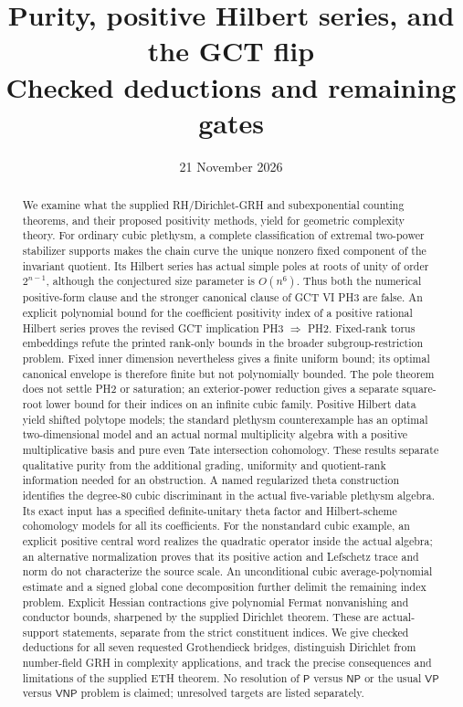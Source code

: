 \documentclass[11pt,a4paper]{article}
\title{Purity, positive Hilbert series, and the GCT flip\\[5pt]\large Checked deductions and remaining gates}
\author{}
\date{21 November 2026}
\begin{document}
\maketitle
\begin{abstract}
We examine what the supplied RH/Dirichlet-GRH and subexponential counting
theorems, and their proposed positivity methods, yield for geometric
complexity theory. For ordinary cubic plethysm, a complete classification
of extremal two-power stabilizer supports makes the chain curve the unique
nonzero fixed component of the invariant quotient. Its Hilbert series
has actual simple poles at roots of unity of order $2^{n-1}$,
although the conjectured size
parameter is $O(n^6)$. Thus both the numerical positive-form clause and
the stronger canonical clause of GCT VI PH3 are false. An explicit
polynomial bound for the coefficient
positivity index of a positive rational Hilbert series proves the revised
GCT implication PH3 $\Rightarrow$ PH2. Fixed-rank torus embeddings refute
the printed rank-only bounds in the broader subgroup-restriction problem.
Fixed inner dimension nevertheless gives a finite uniform bound; its
optimal canonical envelope is therefore finite but not polynomially
bounded. The pole theorem does not settle PH2 or saturation; an
exterior-power reduction gives a separate square-root lower bound for
their indices on an infinite cubic family. Positive Hilbert data yield shifted polytope models; the
standard plethysm counterexample has an optimal two-dimensional model
and an actual normal multiplicity algebra with a positive multiplicative
basis and pure even Tate intersection cohomology. These results separate qualitative purity
from the additional grading, uniformity and quotient-rank information
needed for an obstruction. A named regularized theta construction
identifies the degree-$80$ cubic discriminant in the actual five-variable
plethysm algebra. Its exact input has a specified definite-unitary theta
factor and Hilbert-scheme cohomology models for all its coefficients.
For the nonstandard cubic example, an explicit positive central word
realizes the quadratic operator inside the actual algebra; an alternative
normalization proves that its positive action and Lefschetz trace and
norm do not characterize the source scale. An unconditional cubic average-polynomial estimate
and a signed global cone decomposition further delimit the remaining
index problem. Explicit Hessian contractions give polynomial Fermat
nonvanishing and conductor bounds, sharpened by the supplied Dirichlet
theorem. These are actual-support statements, separate from the strict
constituent indices. We give checked deductions for all seven
requested Grothendieck bridges, distinguish Dirichlet from number-field
GRH in complexity applications, and track the precise consequences and
limitations of the supplied ETH theorem. No resolution of $\mathsf P$
versus $\mathsf{NP}$ or the usual $\mathsf{VP}$ versus $\mathsf{VNP}$
problem is claimed; unresolved targets are listed separately.
\end{abstract}
{\small\setlength{\parskip}{0pt}\tableofcontents}
\clearpage
\end{document}
